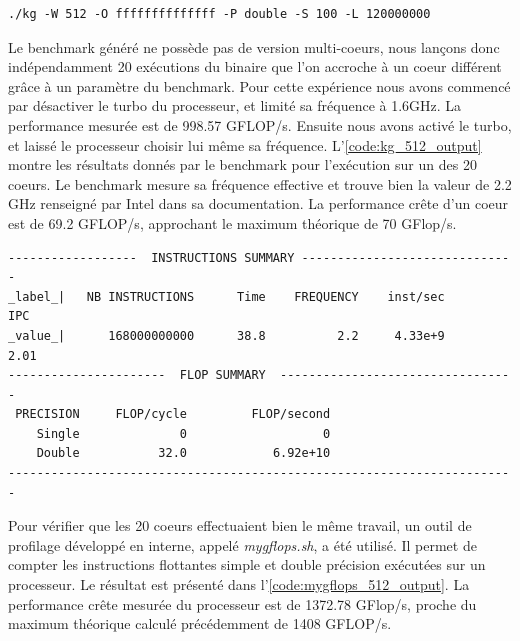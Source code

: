 \begin{lstlisting}[caption=Commande utilisée pour obtenir la performance crête du processeur (GFLOP/s) avec le générateur de benchmark \textit{Kernel\_Generator}., label={code:kg_512},
  basicstyle=\footnotesize, frame=tb,
  xleftmargin=.065\textwidth, xrightmargin=.065\textwidth]
./kg -W 512 -O ffffffffffffff -P double -S 100 -L 120000000
\end{lstlisting}


Le benchmark généré ne possède pas de version multi-coeurs, nous lançons donc indépendamment 20 exécutions du binaire que l'on accroche à un coeur différent grâce à un paramètre du benchmark. Pour cette expérience nous avons commencé par désactiver le turbo du processeur, et limité sa fréquence à 1.6GHz. La performance mesurée est de 998.57 GFLOP/s. Ensuite nous avons activé le turbo, et laissé le processeur choisir lui même sa fréquence. L'\autoref{code:kg_512_output} montre les résultats donnés par le benchmark pour l'exécution sur un des 20 coeurs. Le benchmark mesure sa fréquence effective et trouve bien la valeur de 2.2 GHz renseigné par Intel dans sa documentation. La performance crête d'un coeur est de 69.2 GFLOP/s, approchant le maximum théorique de 70 GFlop/s.


\begin{lstlisting}[caption=Résultat de l'exécution du benchmark sur un coeur avec le turbo activé, label={code:kg_512_output},
  basicstyle=\footnotesize, frame=tb,
  xleftmargin=.005\textwidth, xrightmargin=.005\textwidth]
------------------  INSTRUCTIONS SUMMARY ------------------------------
_label_|   NB INSTRUCTIONS      Time    FREQUENCY    inst/sec       IPC
_value_|      168000000000      38.8          2.2     4.33e+9      2.01
----------------------  FLOP SUMMARY  ---------------------------------
 PRECISION     FLOP/cycle         FLOP/second
    Single              0                   0
    Double           32.0            6.92e+10
-----------------------------------------------------------------------
\end{lstlisting}

Pour vérifier que les 20 coeurs effectuaient bien le même travail, un outil de profilage développé en interne, appelé \textit{mygflops.sh}, a été utilisé. Il permet de compter les instructions flottantes simple et double précision exécutées sur un processeur. Le résultat est présenté dans l'\autoref{code:mygflops_512_output}. La performance crête mesurée du processeur est de 1372.78 GFlop/s, proche du maximum théorique calculé précédemment de 1408 GFLOP/s.

